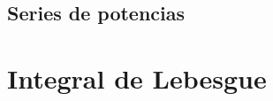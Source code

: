 \documentclass[11pt,spanish]{article} %
\begin{document}
\subsection{Series de potencias}
	
\newpage
\section{Integral de Lebesgue}
\end{document}
